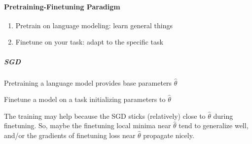 \documentclass[10pt]{report}
\begin{document}
\paragraph{Pretraining-Finetuning Paradigm}\begin{enumerate}
	\item Pretrain on language modeling: learn general things
	\item Finetune on your task: adapt to the specific task
\end{enumerate}
\subparagraph{SGD}
\begin{list}{}{}
	\item Pretraining a language model provides base parameters $\hat{\theta}$
	\item Finetune a model on a task initializing parameters to $\hat{\theta}$
\end{list}
The training may help because the SGD sticks (relatively) close to $\hat{\theta}$ during finetuning. So, maybe the finetuning local minima near $\hat{\theta}$ tend to generalize well, and/or the gradients of finetuning loss near $\hat{\theta}$ propagate nicely.
\end{document}
